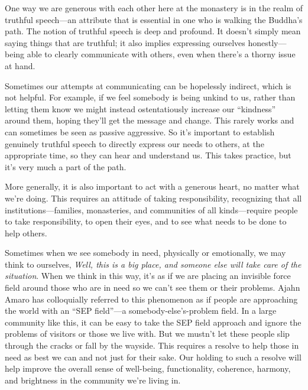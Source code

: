 One way we are generous with each other here at the monastery is in the 
realm of truthful speech---an attribute that is essential in one who is 
walking the Buddha's path. The notion of truthful speech is deep and 
profound. It doesn't simply mean saying things that are truthful; it 
also implies expressing ourselves honestly---being able to clearly 
communicate with others, even when there's a thorny issue at hand.

Sometimes our attempts at communicating can be hopelessly indirect, 
which is not helpful. For example, if we feel somebody is being unkind 
to us, rather than letting them know we might instead ostentatiously 
increase our ``kindness'' around them, hoping they'll get the message 
and change. This rarely works and can sometimes be seen as passive 
aggressive. So it's important to establish genuinely truthful speech to 
directly express our needs to others, at the appropriate time, so they 
can hear and understand us. This takes practice, but it's very much a 
part of the path.

More generally, it is also important to act with a generous heart, no 
matter what we're doing. This requires an attitude of taking 
responsibility, recognizing that all institutions---families, 
monasteries, and communities of all kinds---require people to take 
responsibility, to open their eyes, and to see what needs to be done to 
help others.

Sometimes when we see somebody in need, physically or emotionally, we 
may think to ourselves, \emph{Well, this is a big place, and someone 
else will take care of the situation}. When we think in this way, it's 
as if we are placing an invisible force field around those who are in 
need so we can't see them or their problems. Ajahn Amaro has 
colloquially referred to this phenomenon as if people are approaching 
the world with an ``SEP field''---a somebody-else's-problem field. In a 
large community like this, it can be easy to take the SEP field 
approach and ignore the problems of visitors or those we live with. But 
we mustn't let these people slip through the cracks or fall by the 
wayside. This requires a resolve to help those in need as best we can 
and not just for their sake. Our holding to such a resolve will help 
improve the overall sense of well-being, functionality, coherence, 
harmony, and brightness in the community we're living in.


